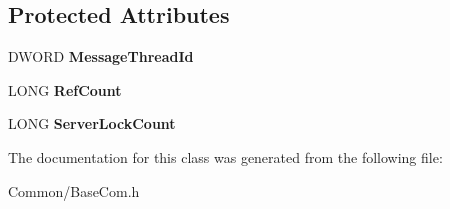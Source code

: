 \subsection*{Protected Attributes}
\begin{DoxyCompactItemize}
\item 
\mbox{\label{class_gost_crypt_factory_a9e1a7a0a6dfa9d369debc493c0b05216}} 
D\+W\+O\+RD {\bfseries Message\+Thread\+Id}
\item 
\mbox{\label{class_gost_crypt_factory_a52f89ec92f9e0eae769608bf80099a4e}} 
L\+O\+NG {\bfseries Ref\+Count}
\item 
\mbox{\label{class_gost_crypt_factory_a9909c018412df19ebaae14818a162b0f}} 
L\+O\+NG {\bfseries Server\+Lock\+Count}
\end{DoxyCompactItemize}


The documentation for this class was generated from the following file\+:\begin{DoxyCompactItemize}
\item 
Common/Base\+Com.\+h\end{DoxyCompactItemize}
